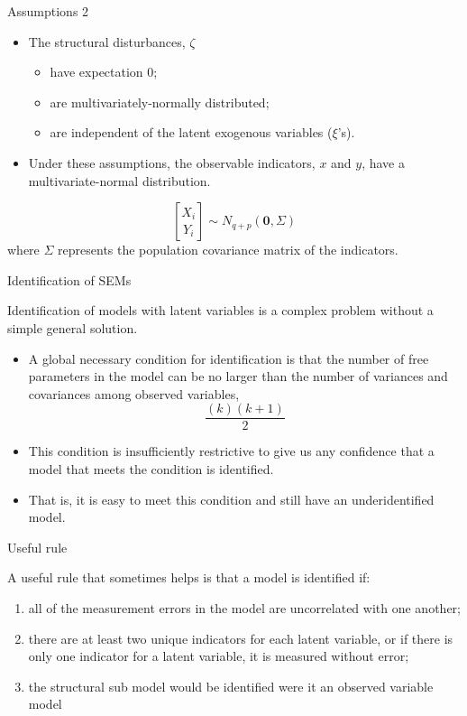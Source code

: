 \documentclass[10pt,ignorenonframetext,]{beamer}
\providecommand{\tightlist}{%
\setlength{\itemsep}{0pt}\setlength{\parskip}{0pt}}
\begin{document}
\begin{frame}{Assumptions 2}

\begin{itemize}
\tightlist
\item
  The structural disturbances, \(\zeta\)

  \begin{itemize}
  \tightlist
  \item
    have expectation 0;
  \item
    are multivariately-normally distributed;
  \item
    are independent of the latent exogenous variables (\(\xi\)'s).
  \end{itemize}
\item
  Under these assumptions, the observable indicators, \(x\) and \(y\),
  have a multivariate-normal distribution.
\end{itemize}

\[
\genfrac{[}{]}{0pt}{0}{X_{i}}{Y_{i}} \sim N_{q+p} ({\mathbf 0,\Sigma})
\] where \(\Sigma\) represents the population covariance matrix of the
indicators.

\end{frame}

\begin{frame}{Identification of SEMs}

Identification of models with latent variables is a complex problem
without a simple general solution.

\begin{itemize}
\tightlist
\item
  A global necessary condition for identification is that the number of
  free parameters in the model can be no larger than the number of
  variances and covariances among observed variables, \[
  \frac{(k)(k + 1)}{2}
  \]
\item
  This condition is insufficiently restrictive to give us any confidence
  that a model that meets the condition is identified.
\item
  That is, it is easy to meet this condition and still have an
  underidentified model.
\end{itemize}

\end{frame}

\begin{frame}{Useful rule}

A useful rule that sometimes helps is that a model is identified if:

\begin{enumerate}
\def\labelenumi{\arabic{enumi}.}
\tightlist
\item
  all of the measurement errors in the model are uncorrelated with one
  another;
\item
  there are at least two unique indicators for each latent variable, or
  if there is only one indicator for a latent variable, it is measured
  without error;
\item
  the structural sub model would be identified were it an observed
  variable model
\end{enumerate}

\end{frame}
\end{document}

